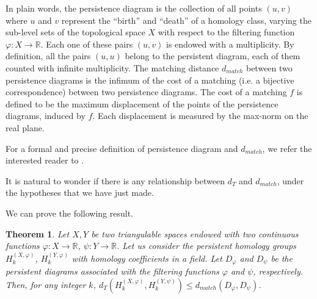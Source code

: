 \documentclass{amsart}
\newtheorem{theorem}{Theorem}[section]
\theoremstyle{definition}
\theoremstyle{remark}
\newcommand{\R}{\mathbb{R}}
\numberwithin{equation}{section}
\begin{document}
In plain words, the persistence diagram is the collection of all points $(u,v)$ where $u$ and $v$ represent the ``birth'' and ``death'' of a homology class, varying the sub-level sets of the topological space $X$ with respect to the filtering function $\varphi:X\to \R$. Each one of these pairs $(u,v)$ is endowed with a multiplicity. By definition, all the pairs $(u,u)$ belong to the persistent diagram, each of them counted with infinite multiplicity. The matching distance $d_{match}$ between two persistence diagrams is the infimum of the cost of a matching (i.e. a bijective correspondence) between two persistence diagrams. The cost of a matching $f$ is defined to be the maximum displacement of the points of the persistence diagrams, induced by $f$. Each displacement is measured by the max-norm on the real plane.

For a formal and precise definition of persistence diagram and $d_{match}$, we refer the interested reader to \cite{CoEdHa07,CeDiFeFrLa09}.


It is natural to wonder if there is any relationship between $d_T$ and $d_{match}$, under the hypotheses that we have just made.

We can prove the following result.

\begin{theorem}\label{dtlessthandelta}
Let $X,Y$ be two triangulable spaces endowed with
two continuous functions $\varphi: X \to \R$, $\psi: Y
\to \R$. Let us consider the persistent homology groups $H^{(X,\varphi)}_k$, $H^{(Y,\varphi)}_k$ with homology coefficients in a field.
Let $D_\varphi$ and $D_\psi$ be the persistent diagrams associated with the filtering functions $\varphi$ and $\psi$, respectively.
Then, for any integer $k$, $d_T\left( H^{(X,\varphi)}_k, H^{(Y,\psi)}_k\right)\le d_{match}(D_\varphi,D_\psi)$.
\end{theorem}
\end{document}
